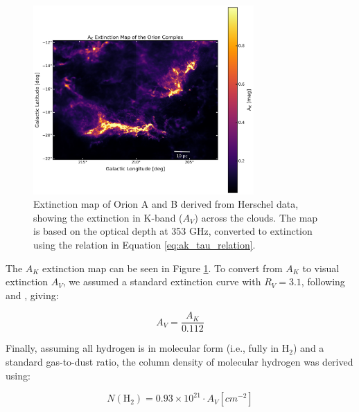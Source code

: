 \begin{figure}[t]
    \centering
    \includegraphics[width=0.75\textwidth]{figures/extinction_map.png}
    \caption{Extinction map of Orion A and B derived from Herschel data, showing the extinction in K-band ($A_V$) across the clouds. The map is based on the optical depth at 353 GHz, converted to extinction using the relation in Equation \ref{eq:ak_tau_relation}.}
    \label{fig:extinction_map}
\end{figure}

The $A_K$ extinction map can be seen in Figure \ref{fig:extinction_map}. 
To convert from $A_K$ to visual extinction $A_V$, we assumed a standard extinction curve with $R_V = 3.1$, following \cite{bohlin1978survey} and \cite{rieke1985interstellar}, giving:

\begin{equation}
    A_V = \frac{A_K}{0.112}
    \label{eq:av_ak_relation}
\end{equation}

Finally, assuming all hydrogen is in molecular form (i.e., fully in H$_2$) and a standard gas-to-dust ratio, the column density of molecular hydrogen was derived using:

\begin{equation}
    N(\mathrm{H_2}) = 0.93 \times 10^{21} \cdot A_V [cm^{-2}]
    \label{eq:n_h2_av_relation}
\end{equation}

